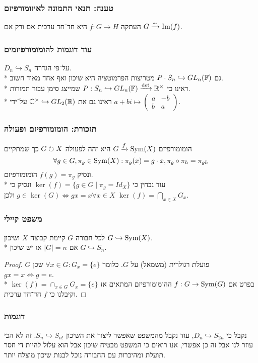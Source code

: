 \subsubsection{טענה: תנאי התמונה לאיזומורפיזם}
העתקה $f : G \to H$ היא חד־חד ערכית אם ורק אם $G \xrightarrow{\sim} \operatorname{Im}(f)$.

\subsubsection{עוד דוגמות להומומורפיזמים}
$D_n \hookrightarrow S_n$ על־פי הגדרה. \\*
גם $P \cdot S_n \hookrightarrow GL_n(\mathbb{F})$ מטריצות הפרמוטציה היא שיכון ואף אחד מאוד חשוב. \\*
ראינו כי $P : S_n \hookrightarrow GL_n(\mathbb{F}) \xrightarrow{\det} \mathbb{R}^\times$ שמייצג סימן עבור תמורות. \\*
ראינו גם את $\mathbb{C}^\times \hookrightarrow GL_2(\mathbb{R})$ על־ידי $a + bi \mapsto \begin{pmatrix} a & -b \\ b & a \end{pmatrix}$.

\subsubsection{תזכורת: הומומורפיזם ופעולה}
הומומורפיזם $G \xrightarrow{f} \operatorname{Sym}(X)$ היא זהה לפעולה $G \circlearrowright X$  כך שמתקיים
\[
	\forall g \in G, \pi_g \in \operatorname{Sym}(X) : \pi_g(x) = g \cdot x, \pi_g \circ \pi_h = \pi_{gh}
\]
ונסיק $f(g) = \pi_g$ הומומורפיזם. \\*
עוד נבחין כי $\ker(f) = \{ g \in G \mid \pi_g = Id_X \}$
ונסיק כי $g \in \ker(G) \iff gx = x \forall x \in X$
ולכן $\ker(f) = \bigcap_{x \in X} G_x$.

\subsubsection{משפט קיילי}
לכל חבורה $G$ קיימת קבוצה $X$ ושיכון $G \hookrightarrow \operatorname{Sym}(X)$. \\*
אם $|G| = n$ אז יש שיכון $G \hookrightarrow S_n$.
\begin{proof}
	$G$ פועלת רגולרית (משמאל) על $G$.
	כלומר $\forall x \in G : G_x = \{e\}$ שכן $gx = x \iff g = e$. \\*
	בפרט אם $f : G \to \operatorname{Sym}(G)$ ההומומורפיזם המתאים אז $\ker(f) = \cap_{x \in G} G_x = \{ e \}$
	וקיבלנו כי $f$ חד־חד ערכית.
\end{proof}

\subsubsection{דוגמות}
נקבל כי $D_n \hookrightarrow S_{2n}$, עוד נקבל מהמשפט שאפשר ליצור את השיכון $S_n \hookrightarrow S_{n!}$.
זה לא הכי עוזר לנו אבל זה כן אפשרי, אנו רואים כי המשפט מבטיח שיכון אבל הוא עלול להיות די חסר תועלת ומהיכרות עם החבורה נוכל לבנות שיכון מוצלח יותר.


